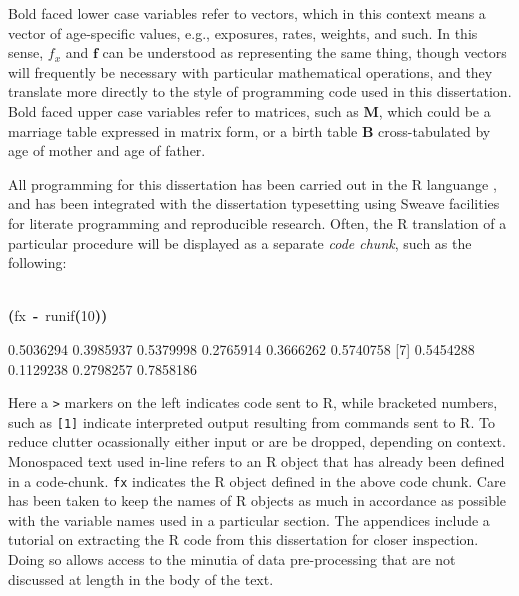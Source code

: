 \documentclass[reqno,12pt,oneside,a4paper]{report} %
\newcommand{\hlnumber}[1]{\textcolor[rgb]{0.0823529411764706,0.0784313725490196,0.709803921568627}{#1}}%
\newcommand{\hlfunctioncall}[1]{\textcolor[rgb]{1,0,0}{#1}}%
\newcommand{\hlkeyword}[1]{\textcolor[rgb]{0,0,0}{\textbf{#1}}}%
\newcommand{\hlassignement}[1]{\textcolor[rgb]{0.215686274509804,0.215686274509804,0.384313725490196}{\textbf{#1}}}%
\newcommand{\hlsymbol}[1]{\textcolor[rgb]{0,0,0}{#1}}%
\newcommand{\hlprompt}[1]{\textcolor[rgb]{0,0,0}{#1}}%
\newcommand{\hlstd}[1]{\textcolor[rgb]{0,0,0}{#1}}%
\newenvironment{Houtput}{\raggedright}{%
%
}
\theoremstyle{plain}
\theoremstyle{definition}
\theoremstyle{remark}
\numberwithin{theorem}{chapter}     %
\renewenvironment{Schunk}{\vspace{\topsep}}{\vspace{\topsep}}
\begin{document}
Bold faced lower case variables refer to vectors, which in this context means a vector of age-specific values, e.g., exposures, rates, weights, and such. In this sense, $f_x$ and $\bm{f}$ can be understood as representing the same thing, though vectors will frequently be necessary with particular mathematical operations, and they translate more directly to the style of programming code used in this dissertation. Bold faced upper case variables refer to matrices, such as $\bm{M}$, which could be a marriage table expressed in matrix form, or a birth table $\bm{B}$ cross-tabulated by age of mother and age of father.

All programming for this dissertation has been carried out in the R languange \citep{Rcitation}, and has been integrated with the dissertation typesetting using Sweave \citep{lmucs-papers:Leisch:2002} facilities for literate programming and reproducible research. Often, the R translation of a particular procedure will be displayed as a separate \textit{code chunk}, such as the following:

\begin{Houtput}
\hspace*{\fill}\\
\hlstd{}\ttfamily\noindent
\hlprompt{\usebox{\hlnormalsizeboxgreaterthan}{\ }}\hlkeyword{(}\hlsymbol{fx}{\ }\hlassignement{\usebox{\hlnormalsizeboxlessthan}-}{\ }\hlfunctioncall{runif}\hlkeyword{(}\hlnumber{10}\hlkeyword{)}\hlkeyword{)}\mbox{}
\normalfont
\hspace*{\fill}\\
\hlstd{}\begin{Schunk}
\begin{Soutput}
 [1] 0.5036294 0.3985937 0.5379998 0.2765914 0.3666262 0.5740758
 [7] 0.5454288 0.1129238 0.2798257 0.7858186
\end{Soutput}

\end{Schunk}
\end{Houtput}

Here a \texttt{>} markers on the left indicates code sent to R, while bracketed numbers, such as \texttt{[1]} indicate interpreted output resulting from commands sent to R. To reduce clutter ocassionally either input or are be dropped, depending on context. Monospaced text used in-line refers to an R object that has already been defined in a code-chunk. \texttt{fx} indicates the R object defined in the above code chunk. Care has been taken to keep the names of R objects as much in accordance as possible with the variable names used in a particular section. The appendices include a tutorial on extracting the R code from this dissertation for closer inspection. Doing so allows access to the minutia of data pre-processing that are not discussed at length in the body of the text.
\end{document}
